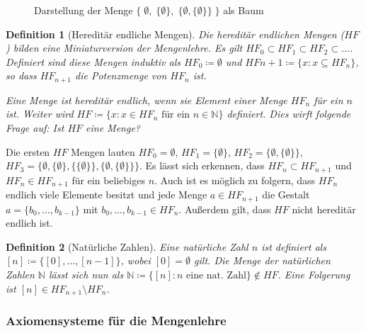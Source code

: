 \documentclass[german]{article}
\theoremstyle{break}
\theoremstyle{def_style}
\newtheorem{definition}{Definition}[section]
\theoremstyle{def_style}
\theoremstyle{lemma_style}
\begin{document}
\begin{figure}[h]
	\begin{center}
	\end{center}
\caption{Darstellung der Menge $\{\; \emptyset, \; \{\emptyset\}, \; \{\emptyset,\{\emptyset\}\}\;\}$ als Baum}
\label{Mengenbaum}
\end{figure}

\begin{definition}[Hereditär endliche Mengen]
	Die \textit{hereditär endlichen Mengen} ($HF$) bilden eine Miniaturversion der Mengenlehre. Es gilt $HF_0\subset HF_1 \subset HF_2 \subset \dots$. Definiert sind diese Mengen induktiv als $HF_0\coloneqq \emptyset$ und $HF{n+1}\coloneqq \{x : x\subseteq HF_n\}$, so dass $HF_{n+1}$ die Potenzmenge von $HF_n$ ist.
	
	Eine Menge ist hereditär endlich, wenn sie Element einer Menge $HF_n$ für ein $n$ ist. Weiter wird $HF\coloneqq\{x : x \in HF_n \text{ für ein }n\in \mathbb{N}\}$ definiert.
	Dies wirft folgende Frage auf: Ist $HF$ eine Menge? 
\end{definition}

Die ersten $HF$ Mengen lauten $HF_0=\emptyset$, $HF_1=\{\emptyset\}$, $HF_2=\{\emptyset,\{\emptyset\}\}$, $HF_3=\{\emptyset, \{\emptyset\}, \{\{\emptyset\}\}, \{\emptyset,\{\emptyset\}\}\}$. Es lässt sich erkennen, dass $HF_n\subset HF_{n+1}$ und $HF_n\in HF_{n+1}$ für ein beliebiges $n$. Auch ist es möglich zu folgern, dass $HF_n$ endlich viele Elemente besitzt und jede Menge $a\in HF_{n+1}$ die Gestalt $a=\{b_0,\dots,b_{k-1}\}$ mit $b_0,\dots,b_{k-1}\in HF_n$. Außerdem gilt, dass $HF$ nicht hereditär endlich ist.

\begin{definition}[Natürliche Zahlen]
	Eine \textit{natürliche Zahl} $n$ ist definiert als $[n]\coloneqq\{[0],\dots,[n-1]\}$, wobei $[0]=\emptyset$ gilt. Die Menge der natürlichen Zahlen $\mathbb{N}$ lässt sich nun als $\mathbb{N}\coloneqq\{[n] : n \text{ eine nat. Zahl}\} \notin HF$. Eine Folgerung ist $[n]\in HF_{n+1}\setminus HF_n$.
\end{definition}

\subsubsection{Axiomensysteme für die Mengenlehre}
\end{document}
